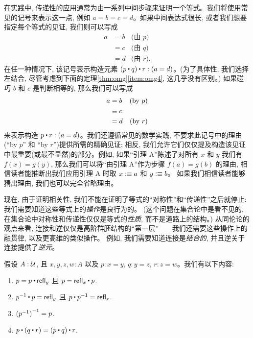 在实践中, 传递性的应用通常为由一系列中间步骤来证明一个等式。我们将使用常见的记号来表示这一点, 例如 $a=b=c=d$。如果中间表达式很长, 或者我们想要指定每个等式的见证, 我们则可以写成
\begin{align*}
  a &= b & \text{(由 $p$)}\\ &= c &\text{(由 $q$)} \\ &= d &\text{(由 $r$)}.
\end{align*}
在任一种情况下, 该记号表示构造元素 $(p\ct q)\ct r: (a=d)$。(为了具体性, 我们选择左结合, 尽管考虑到下面的定理\ref{thm:omg}\ref{item:omg4}, 这几乎没有区别。)
如果碰巧 $b$ 和 $c$ 是判断相等的, 那么我们可以写成
\begin{align*}
  a &= b & \text{(by $p$)}\\ &\equiv c \\ &= d &\text{(by $r$)}
\end{align*}
来表示构造 $p\ct r : (a=d)$。我们还遵循常见的数学实践, 不要求此记号中的理由(``by $p$'' 和 ``by $r$'')提供所需的精确见证; 
相反, 我们允许它们仅仅提及构造该见证中最重要(或最不显然)的部分。例如, 如果``引理 A''陈述了对所有 $x$ 和 $y$ 我们有 $f(x)=g(y)$, 
那么我们可以将``由引理 A''作为步骤 $f(a) = g(b)$ 的理由, 相信读者能推断出我们应用引理 A 时取 $x\vcentcolon\equiv a$ 和 $y\vcentcolon\equiv b$。
如果我们相信读者能够猜出理由, 我们也可以完全省略理由。

现在, 由于证明相关性, 我们不能在证明了等式的``对称性''和``传递性''之后就停止: 我们需要知道这些等式上的\emph{操作}是良行为的。
(这个问题在集合论中是看不见的, 在集合论中对称性和传递性仅仅是等式的\emph{性质}, 而不是道路上的结构。)
从同伦论的观点来看, 连接和逆仅仅是高阶群胚结构的``第一层''——我们还需要这些操作上的融贯律, 以及更高维的类似操作。
例如, 我们需要知道连接是\emph{结合的}, 并且逆关于连接提供了\emph{逆元}。

\begin{lem}\label{thm:omg}%
  假设 $A:\mathcal{U}$, 且 $x,y,z,w:A$ 以及 $p:x= y$, $q:y = z$, $r:z=w$。我们有以下内容:
  \begin{enumerate}
  \item $p= p\ct \refl{y}$ 且 $p = \refl{x} \ct p$.\label{item:omg1}
  \item $\opp{p}\ct p=  \refl{y}$ 且 $p\ct \opp{p}= \refl{x}$.\label{item:omg2}
  \item $\mathord{{(\mathord{{p}^{-1}})}^{-1}}= p$.\label{item:omg3}
  \item $p\ct (q\ct r)=  (p\ct q)\ct r$.\label{item:omg4}
  \end{enumerate}
\end{lem}

